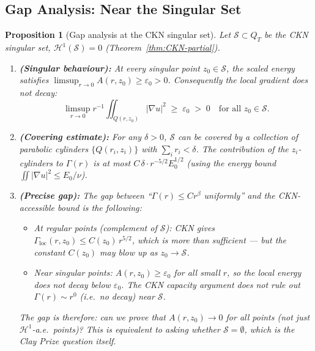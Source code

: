 \documentclass[11pt]{article}
\newtheorem{proposition}[theorem]{Proposition}
\theoremstyle{definition}
\theoremstyle{remark}
\newcommand{\grad}{\nabla}
\begin{document}
\subsection{Gap Analysis: Near the Singular Set}
\label{subsec:ckn-gap}

\begin{proposition}[Gap analysis at the CKN singular set]
\label{prop:ckn-gap-analysis}
Let $\mathcal{S} \subset Q_T$ be the CKN singular set,
$\mathcal{H}^1(\mathcal{S}) = 0$ (Theorem~\ref{thm:CKN-partial}).
\begin{enumerate}[label=(\alph*)]
\item \textbf{(Singular behaviour):}
  At every singular point $z_0 \in \mathcal{S}$, the scaled energy
  satisfies $\limsup_{r \to 0} A(r, z_0) \geq \varepsilon_0 > 0$.
  Consequently the local gradient does not decay:
  \begin{equation}\label{eq:singular-no-decay}
    \limsup_{r\to 0} r^{-1} \iint_{Q(r,z_0)} |\grad u|^2
    \;\geq\; \varepsilon_0 \;>\; 0
    \quad \text{for all } z_0 \in \mathcal{S}.
  \end{equation}

\item \textbf{(Covering estimate):}
  For any $\delta > 0$, $\mathcal{S}$ can be covered by a collection of
  parabolic cylinders $\{Q(r_i, z_i)\}$ with $\sum_i r_i < \delta$.
  The contribution of the $z_i$-cylinders to $\Gamma(r)$ is at most
  $C\, \delta \cdot r^{-5/2} E_0^{1/2}$ (using the energy bound
  $\iint |\grad u|^2 \leq E_0/\nu$).

\item \textbf{(Precise gap):}
  The gap between ``$\Gamma(r) \leq C r^\beta$ uniformly'' and the
  CKN-accessible bound is the following:
  \begin{itemize}
    \item At regular points (complement of $\mathcal{S}$): CKN gives
      $\Gamma_{\mathrm{loc}}(r, z_0) \leq C(z_0)\, r^{5/2}$, which is
      more than sufficient --- but the constant $C(z_0)$ may blow up as
      $z_0 \to \mathcal{S}$.
    \item Near singular points: $A(r, z_0) \geq \varepsilon_0$ for all
      small $r$, so the local energy does \emph{not} decay below
      $\varepsilon_0$.  The CKN capacity argument does not rule out
      $\Gamma(r) \sim r^0$ (i.e.\ no decay) near $\mathcal{S}$.
  \end{itemize}
  The gap is therefore: \emph{can we prove that $A(r, z_0) \to 0$ for
  all points (not just $\mathcal{H}^1$-a.e.\ points)?}
  This is equivalent to asking whether $\mathcal{S} = \emptyset$,
  which is the Clay Prize question itself.
\end{enumerate}
\end{proposition}
\end{document}
